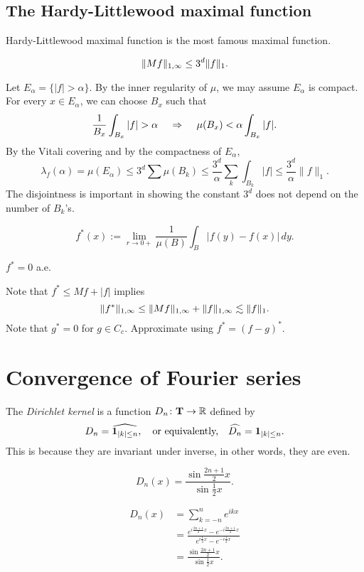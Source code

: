 \documentclass{../crs}
\begin{document}
\subsection{The Hardy-Littlewood maximal function}
Hardy-Littlewood maximal function is the most famous maximal function.

\begin{thm}
\[\|Mf\|_{1,\infty}\le 3^d\|f\|_1.\]
\end{thm}
\begin{pf}
Let $E_\alpha=\{|f|>\alpha\}$.
By the inner regularity of $\mu$, we may assume $E_\alpha$ is compact.
For every $x\in E_\alpha$, we can choose $B_x$ such that
\[\frac1{B_x}\int_{B_x}|f|>\alpha\quad\impl\quad\mu(B_x)<\alpha\int_{B_x}|f|.\]
By the Vitali covering and by the compactness of $E_\alpha$,
\[\lambda_f(\alpha)=\mu(E_\alpha)\le3^d\sum\mu(B_k)\le\frac{3^d}\alpha\sum_k\int_{B_k}|f|\le\frac{3^d}\alpha\|f\|_1.\]
The disjointness is important in showing the constant $3^d$ does not depend on the number of $B_k$'s.
\end{pf}

\begin{defn}
\[f^*(x):=\lim_{r\to0+}\frac1{\mu(B)}\int_B|f(y)-f(x)|\,dy.\]
\end{defn}
\begin{thm}
$f^*=0$ a.e.
\end{thm}
\begin{pf}
Note that $f^*\le Mf+|f|$ implies
\[\|f^*\|_{1,\infty}\le\|Mf\|_{1,\infty}+\|f\|_{1,\infty}\lesssim\|f\|_1.\]
Note that $g^*=0$ for $g\in C_c$.
Approximate using $f^*=(f-g)^*$.
\end{pf}








\section{Convergence of Fourier series}
\begin{defn}
The \emph{Dirichlet kernel} is a function $D_n\colon \bT\to\R$ defined by
\[D_n=\widehat{\bold{1}_{|k|\le n}},\quad\text{or equivalently,}\quad\widehat{D_n}=\bold{1}_{|k|\le n}.\]
This is because they are invariant under inverse, in other words, they are even.
\end{defn}

\begin{thm}
\[D_n(x)=\frac{\sin\frac{2n+1}2x}{\sin\frac12x}.\]
\end{thm}
\begin{pf}
\begin{align*}
D_n(x)&=\sum_{k=-n}^ne^{ikx}\\
&=\frac{e^{i\frac{2n+1}2x}-e^{-i\frac{2n+1}2x}}{e^{i\frac12x}-e^{-i\frac12x}}\\
&=\frac{\sin\frac{2n+1}2x}{\sin\frac12x}.
\end{align*}

\end{pf}
\end{document}
